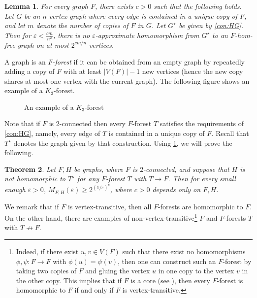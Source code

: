 \documentclass[reqno, english, 12pt]{amsart}
\theoremstyle{plain}
\newtheorem{theorem}{Theorem}[section]
\newtheorem{lemma}[theorem]{Lemma}
\theoremstyle{remark}
\renewcommand{\geq}{\geqslant}
\begin{document}
\begin{lemma}\label{prop:no-approx-hom}
For every graph $F$, there exists $c>0$ such that the following holds.
Let $G$ be an $n$-vertex graph where every edge is contained in a unique copy of $F$, and let $m$ denote the number of copies of $F$ in $G$.
Let $G^{\star}$ be given by \cref{con:HG}. 
Then for $\varepsilon < \frac{cm}{n^2}$, there is no $\varepsilon$-approximate homomorphism from $G^{\star}$ to an $F$-hom-free graph on at most $2^{c m/n}$ vertices.
\end{lemma}

A graph is an {\em $F$-forest} if it can be obtained from an empty graph by repeatedly adding a copy of $F$ with at least $|V(F)|-1$ new vertices (hence the new copy shares at most one vertex with the current graph). The following figure shows an example of a $K_3$-forest.
\begin{figure}[h]
\begin{center}
    \caption{An example of a $K_3$-forest}
\end{center} 
\end{figure}

Note that if $F$ is $2$-connected then every $F$-forest $T$ satisfies the requirements of \cref{con:HG}, namely, every edge of $T$ is contained in a unique copy of $F$. Recall that $T^{\star}$ denotes the graph given by that construction.
Using \cref{prop:no-approx-hom}, we will prove the following.
\begin{theorem}\label{thm:approx hom hardness}
	Let $F,H$ be graphs, where $F$ is $2$-connected, and suppose that $H$ is not homomorphic to $T^{\star}$ for any $F$-forest $T$ with $T\rightarrow F$. 
	Then for every small enough $\varepsilon > 0$,
	$M_{F,H}(\varepsilon) \geq 2^{(1/\varepsilon)^c}$, where $c > 0$ depends only on $F,H$. 
\end{theorem}
We remark that if $F$ is vertex-transitive, then all $F$-forests are homomorphic to $F$. On the other hand, there are examples of non-vertex-transitive\footnote{Indeed, if there exist $u,v \in V(F)$ such that there exist no homomorphisms $\phi,\psi:F \to F$ with $\phi(u) = \psi(v)$, then one can construct such an $F$-forest by taking two copies of $F$ and gluing the vertex $u$ in one copy to the vertex $v$ in the other copy. This implies that if $F$ is a core (see \cite{MR1192374}), then every $F$-forest is homomorphic to $F$ if and only if $F$ is vertex-transitive.} $F$ and $F$-forests $T$ with $T \not \to F$.
\end{document}
